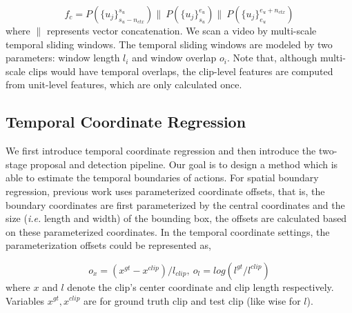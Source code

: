 \documentclass{bmvc2k}
\begin{document}
\begin{equation}
f_c=P(\{u_j\}_{s_u-n_{ctx}}^{s_u}) \parallel ~P(\{u_j\}_{s_u}^{e_u})\parallel ~P(\{u_j\}_{e_u}^{e_u+n_{ctx}})
\end{equation}
where $\parallel$ represents vector concatenation. We scan a video by multi-scale temporal sliding windows. The temporal sliding windows are modeled by two parameters: window length $l_i$ and window overlap $o_i$. Note that, although multi-scale clips would have temporal overlaps, the clip-level features are computed from unit-level features, which are only calculated once. 




\subsection{Temporal Coordinate Regression}
We first introduce temporal coordinate regression and then introduce the two-stage proposal and detection pipeline. Our goal is to design a method which is able to estimate the temporal boundaries of actions. For spatial boundary regression, previous work \cite{ren2015faster, girshick2015fast} uses parameterized coordinate offsets, that is, the boundary coordinates are first parameterized by the central coordinates and the size (\emph{i.e.} length and width) of the bounding box, the offsets are calculated based on these parameterized coordinates. In the temporal coordinate settings, the parameterization offsets could be represented as, 

\begin{equation}
o_x=(x^{gt}-x^{clip})/l_{clip},  \ o_l=log(l^{gt}/l^{clip})
\end{equation}
where $x$ and $l$ denote the clip's center coordinate and clip length respectively. Variables $x^{gt}, x^{clip}$ are for ground truth clip and test clip (like wise for $l$). 
\end{document}
